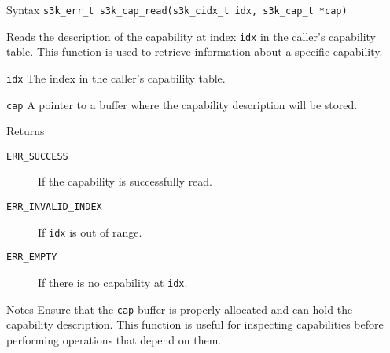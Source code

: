 \documentclass[a4paper,11pt]{article}
\newcommand{\syscall}[1]{\texttt{#1}}
\newenvironment{syscalldoc}[1]{
  \begin{tcolorbox}[breakable,title=\subsection{\syscall{#1}}]
  \begin{description}[leftmargin=!,style=nextline,noitemsep]
}{
  \end{description}
  \end{tcolorbox}
}
\begin{document}
\begin{syscalldoc}{s3k\_cap\_read}
  \item[Syntax] \lstinline{s3k_err_t s3k_cap_read(s3k_cidx_t idx, s3k_cap_t *cap)}
  \item[Description] Reads the description of the capability at index \verb|idx| in the caller's capability table. This function is used to retrieve information about a specific capability.
  \item[Parameters]
    \begin{description}
      \item[]
      \item[\texttt{idx}] The index in the caller's capability table.
      \item[\texttt{cap}] A pointer to a buffer where the capability description will be stored.
    \end{description}
  \item[Returns]
    \begin{description}
      \item[]
      \item[\texttt{ERR\_SUCCESS}] If the capability is successfully read.
      \item[\texttt{ERR\_INVALID\_INDEX}] If \verb|idx| is out of range.
      \item[\texttt{ERR\_EMPTY}] If there is no capability at \verb|idx|.
    \end{description}
  \item[Notes] Ensure that the \verb|cap| buffer is properly allocated and can hold the capability description. This function is useful for inspecting capabilities before performing operations that depend on them.
\end{syscalldoc}
\end{document}
